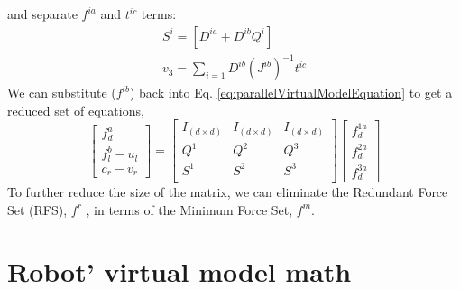\documentclass[]{article}
\begin{document}
and separate $f^{ia}$ and $t^{ic}$ terms: 
\begin{eqnarray}
\label{eq:Si}
S^i=[D^{ia}+D^{ib}Q^i]	\\
\label{eq:v3S}
v_3=\sum_{i=1}D^{ib}(J^{ib})^{-1}t^{ic}	
\end{eqnarray}
We can substitute ($f^{ib}$) back into Eq. \ref{eq:parallelVirtualModelEquation} to get a reduced set of equations,
\begin{equation}
\begin{bmatrix}
f_d^a			\\
f_l^{b}-u_l	\\
c_r-v_r
\end{bmatrix}
=
\begin{bmatrix}
I_{(d\times d)}	&I_{(d\times d)}	&I_{(d\times d)}	\\ 
Q^1				&Q^2			&Q^3			\\
S^1				&S^2			&S^3			\\
\end{bmatrix}
\begin{bmatrix}
f_d^{1a} 	\\
f_d^{2a}	\\
f_d^{3a} 	
\end{bmatrix}
\label{eq:parallelVirtualModelEquationReduced}
\end{equation}
To further reduce the size of the matrix, we can eliminate the
Redundant Force Set (RFS), $f^r$ , in terms of the Minimum Force Set, $f^m$.
\section{Robot' virtual model math}
\end{document}
